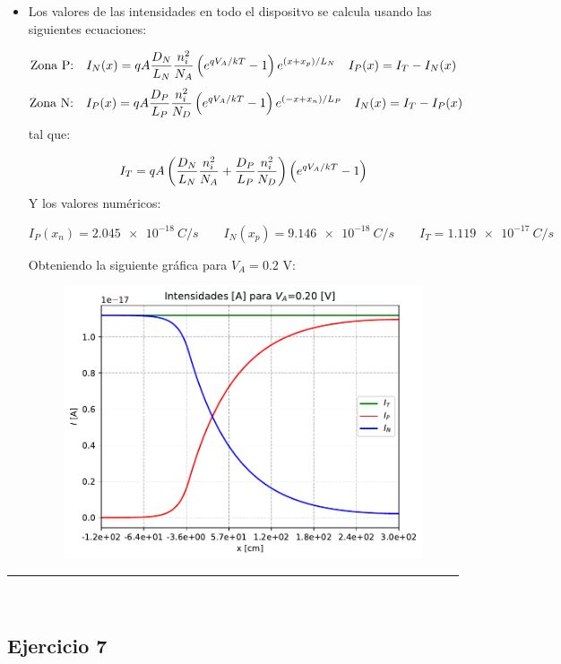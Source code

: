\begin{itemize}
    \item Los valores de las intensidades en todo el dispositvo se calcula usando las siguientes ecuaciones: 
    
    \begin{equation*}
        \text{Zona P:} \quad 
        I_N(x) = qA\frac{D_N}{L_N} \frac{n_i^2}{N_A}  \left( e^{qV_A/kT}-1 \right) e^{(x+x_p)/L_N} \quad I_P(x) = I_T - I_N (x)
    \end{equation*}
    \begin{equation*}
        \text{Zona N:} \quad 
        I_P(x) = qA\frac{D_P}{L_P} \frac{n_i^2}{N_D}  \left( e^{qV_A/kT}-1 \right) e^{(-x+x_n)/L_P} \quad I_N(x) = I_T - I_P (x)
    \end{equation*}
    tal que:

    \begin{equation*}
        I_T = qA\left( \frac{D_N}{L_N} \frac{n_i^2}{N_A}+\frac{D_P}{L_P} \frac{n_i^2}{N_D} \right)  \left( e^{q V_A/kT}-1 \right)
    \end{equation*}
    Y los valores numéricos:

    \begin{equation}
        I_P (x_n) = \SI{2.045e-18}{C/s} \qquad 
        I_N (x_p) = \SI{9.146e-18}{C/s} \qquad
        I_T = \SI{1.119e-17}{C/s}
    \end{equation}

    Obteniendo la siguiente gráfica para $V_A=0.2$ V: 


    \begin{figure}[h!] \centering
        \includegraphics[width=0.6\linewidth]{Cuerpo/Ch_03/03_06_02.pdf}
    \end{figure}
    
\end{itemize}

\rule{\textwidth}{0.1pt} \\[2pt]


\subsection{Ejercicio 7} 

